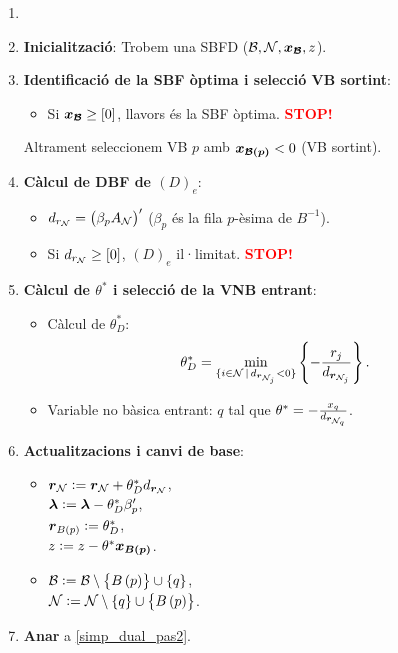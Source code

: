 \begin{alg}
    \begin{enumerate}
        \item[]
        \item {\bf Inicialització}: Trobem una SBFD ($\mathcal{B}, \mathcal{N}, \boldsymbol{x_{\mathcal{B}}}, z$).
        \item \label{simp_dual_pas2} {\bf Identificació de la SBF òptima i selecció VB sortint}:
            \begin{itemize}
                \item Si $\boldsymbol{x_{\mathcal{B}}} \geq \left[0\right]$, llavors és la SBF òptima. \textcolor{red}{\bf STOP!}
            \end{itemize}
            Altrament seleccionem VB $p$ amb $\boldsymbol{x_{\mathcal{B}\left(p\right)}} < 0$ (VB sortint).
        \item {\bf Càlcul de DBF de $\left(D\right)_e$}:
            \begin{itemize}
                \item $d_{r_{\mathcal{N}}} = \left(\beta_p A_{\mathcal{N}}\right)^\prime$ ($\beta_p$ és la fila $p$-èsima de $B^{-1}$).
                \item Si $d_{r_{\mathcal{N}}} \geq \left[0\right]$, $\left(D\right)_e$ il·limitat. \textcolor{red}{\bf STOP!}
            \end{itemize}
        \item {\bf Càlcul de $\theta^*$ i selecció de la VNB entrant}:
            \begin{itemize}
                \item Càlcul de $\theta_D^*$: 
                    \[\theta_D^* = \min_{\{i \in \mathcal{N} \,|\, d_{\boldsymbol{r}_{\mathcal{N}_j}} < 0\}} \left\{-\frac{r_j}{d_{\boldsymbol{r}_{\mathcal{N}_j}}} \right\}.\]
                \item Variable no bàsica entrant: $q$ tal que $\theta^* = -\frac{x_q}{d_{\boldsymbol{r}_{\mathcal{N}_q}}}$.
            \end{itemize}
        \item {\bf Actualitzacions i canvi de base}:
            \begin{itemize}
                \item $\boldsymbol{r}_{\mathcal{N}} := \boldsymbol{r}_{\mathcal{N}} + \theta_D^* d_{\boldsymbol{r}_{\mathcal{N}}}$, \\
                    $\boldsymbol{\lambda} := \boldsymbol{\lambda} - \theta_D^* \beta_p^\prime$, \\
                    $\boldsymbol{r}_{B\left(p\right)} := \theta_D^*$, \\
                    $z := z - \theta^* \boldsymbol{x_{B\left(p\right)}}$.
                \item $\mathcal{B} := \mathcal{B} \setminus \left\{B\left(p\right)\right\} \cup \left\{q\right\}$, \\
                    $\mathcal{N} := \mathcal{N} \setminus \left\{q\right\} \cup \left\{B\left(p\right)\right\}$.
            \end{itemize}
        \item {\bf Anar} a \ref{simp_dual_pas2}.
    \end{enumerate}
\end{alg}

